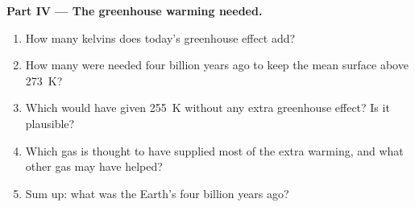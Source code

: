 \begin{problem}
\medskip
\noindent\textbf{Part IV --- The greenhouse warming needed.}
\begin{enumerate}[resume]
  \item How many kelvins does today's greenhouse effect add?
  \item How many were needed four billion years ago to keep the mean
        surface above \qty{273}{K}?
  \item Which  would have given \qty{255}{K} without any extra
        greenhouse effect? Is it plausible?
  \item Which gas is thought to have supplied most of the extra warming, and
        what other gas may have helped?
  \item Sum up: what was the Earth's  four billion
        years ago?
\end{enumerate}
\end{problem}
